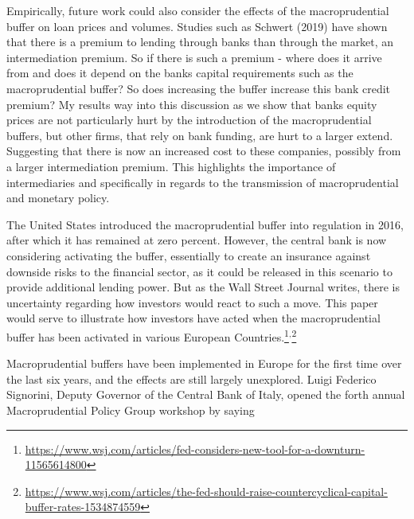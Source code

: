 \documentclass[11pt]{article}
\begin{document}
Empirically, future work could also consider the effects of the macroprudential buffer on loan prices and volumes.
Studies such as Schwert (2019) have shown that there is a premium to lending through banks than through the market, an intermediation premium. So if there is such a premium - where does it arrive from and does it depend on the banks capital requirements such as the macroprudential buffer? So does increasing the buffer increase this bank credit premium? My results way into this discussion as we show that banks equity prices are not particularly hurt by the introduction of the macroprudential buffers, but other firms, that rely on bank funding, are hurt to a larger extend. Suggesting that there is now an increased cost to these companies, possibly from a larger intermediation premium. This highlights the importance of intermediaries and specifically in regards to the transmission of macroprudential and monetary policy.


The United States introduced the macroprudential buffer into regulation in 2016, after which it has remained at zero percent. However, the central bank is now considering activating the buffer, essentially to create an insurance against downside risks to the financial sector, as it could be released in this scenario to provide additional lending power. But as the Wall Street Journal writes, there is uncertainty regarding how investors would react to such a move. This paper would serve to illustrate how investors have acted when the macroprudential buffer has been activated in various European Countries.\footnote{
\url{https://www.wsj.com/articles/fed-considers-new-tool-for-a-downturn-11565614800}}$^,$\footnote{
\url{https://www.wsj.com/articles/the-fed-should-raise-countercyclical-capital-buffer-rates-1534874559}}

Macroprudential buffers have been implemented in Europe for the first time over the last six years, and the effects are still largely unexplored. Luigi Federico Signorini, Deputy Governor of the Central Bank of Italy, opened the forth annual Macroprudential Policy Group workshop by saying
\end{document}

